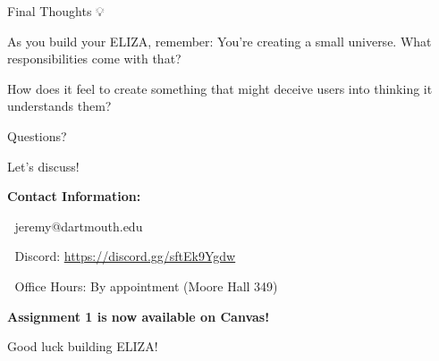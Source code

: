 \documentclass[aspectratio=169]{beamer}
\begin{document}
\begin{frame}{Final Thoughts 💡}
\begin{center}
\end{center}

\vspace{0.3cm}

\begin{discussion}
As you build your ELIZA, remember: You're creating a small universe. What responsibilities come with that?

How does it feel to create something that might deceive users into thinking it understands them?
\end{discussion}
\end{frame}

\begin{frame}{Questions? 🤔}
\begin{center}
\Large{Let's discuss!}

\vspace{0.5cm}

\textbf{Contact Information:}

📧 jeremy@dartmouth.edu

💬 Discord: \href{https://discord.gg/sftEk9Ygdw}{https://discord.gg/sftEk9Ygdw}

🏢 Office Hours: By appointment (Moore Hall 349)

\vspace{0.3cm}

\textbf{Assignment 1 is now available on Canvas!}

\vspace{0.3cm}

\large{Good luck building ELIZA! 🚀}
\end{center}
\end{frame}
\end{document}
